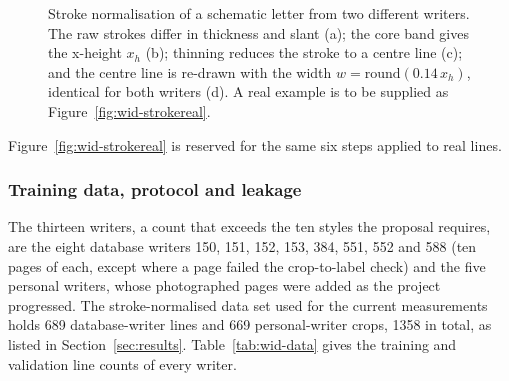 \begin{figure}[h]
\caption{Stroke normalisation of a schematic letter from two different writers. The raw strokes differ in thickness and slant (a); the core band gives the x-height $x_h$ (b); thinning reduces the stroke to a centre line (c); and the centre line is re-drawn with the width $w=\mathrm{round}(0.14\,x_h)$, identical for both writers (d). A real example is to be supplied as Figure~\ref{fig:wid-strokereal}.}
\label{fig:wid-strokenorm}
\end{figure}

Figure~\ref{fig:wid-strokereal} is reserved for the same six steps applied to real lines.

\label{fig:wid-strokereal}

\subsubsection{Training data, protocol and leakage}

The thirteen writers, a count that exceeds the ten styles the proposal requires, are the eight database writers 150, 151, 152, 153, 384, 551, 552 and 588 (ten pages of each, except where a page failed the crop-to-label check) and the five personal writers, whose photographed pages were added as the project progressed.
The stroke-normalised data set used for the current measurements holds 689 database-writer lines and 669 personal-writer crops, 1358 in total, as listed in Section~\ref{sec:results}.
Table~\ref{tab:wid-data} gives the training and validation line counts of every writer.

